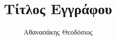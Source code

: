 \documentclass[hidelinks, a4paper, 12pt]{report}
\title{Τίτλος Εγγράφου}
\author{Αθανασάκης Θεοδόσιος}
\begin{document}
    
    
    
    \renewcommand{\contentsname}{Περιεχόμενα}
    \renewcommand{\listfigurename}{Λίστα Σχημάτων}
    \renewcommand{\listtablename}{Λίστα Πινάκων}
    \renewcommand{\chaptername}{Κεφάλαιο}
    \renewcommand{\appendixname}{Παράρτημα}
    \renewcommand{\bibname}{Βιβλιογραφία}
    
    \setlength{\parskip}{0.5em}     %

    \tableofcontents
    
    \newpage
    
    \setlength{\parskip}{1em}       %

    
    
    \appendix
    
    
    \printbibliography[heading=bibintoc]
\end{document}
